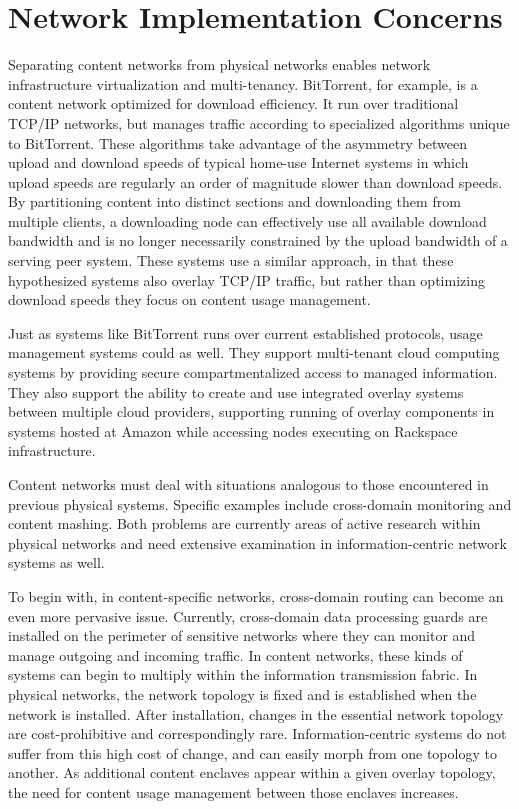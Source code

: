 \section{Network Implementation Concerns}
Separating content networks from physical networks enables network infrastructure virtualization and multi-tenancy.  BitTorrent, for example, is a content network optimized for download efficiency.  It run over traditional TCP/IP networks, but manages traffic according to specialized algorithms unique to BitTorrent.  These algorithms take advantage of the asymmetry between upload and download speeds of typical home-use Internet systems in which upload speeds are regularly an order of magnitude slower than download speeds.  By partitioning content into distinct sections and downloading them from multiple clients, a downloading node can effectively use all available download bandwidth and is no longer necessarily constrained by the upload bandwidth of a serving peer system.  These systems use a similar approach, in that these hypothesized systems also overlay TCP/IP traffic, but rather than optimizing download speeds they focus on content usage management.

Just as systems like BitTorrent runs over current established protocols, usage management systems could as well.  They support multi-tenant cloud computing systems by providing secure compartmentalized access to managed information.  They also support the ability to create and use integrated overlay systems between multiple cloud providers, supporting running of overlay components in systems hosted at Amazon while accessing nodes executing on Rackspace infrastructure.

Content networks must deal with situations analogous to those encountered in previous physical systems.  Specific examples include cross-domain monitoring and content mashing.  Both problems are currently areas of active research within physical networks and need extensive examination in information-centric network systems as well.

To begin with, in content-specific networks, cross-domain routing can become an even more pervasive issue.  Currently, cross-domain data processing guards are installed on the perimeter of sensitive networks where they can monitor and manage outgoing and incoming traffic.  In content networks, these kinds of systems can begin to multiply within the information transmission fabric.  In physical networks, the network topology is fixed and is established when the network is installed.  After installation, changes in the essential network topology are cost-prohibitive and correspondingly rare.  Information-centric systems do not suffer from this high cost of change, and can easily morph from one topology to another.  As additional content enclaves appear within a given overlay topology, the need for content usage management between those enclaves increases.

